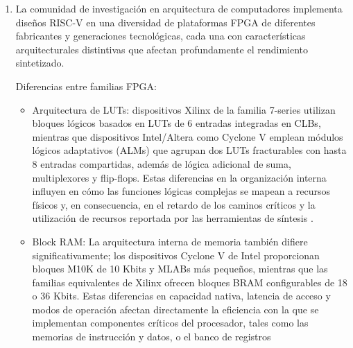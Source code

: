 \begin{enumerate}
\begin{itemize}
            \item Validación de equivalencia: después de pasar suites como riscv-tests de manera individual, es necesario comprobar que las dos microarquitecturas den resultados exactamente coincidentes (bit a bit) para programas más complejos, no solo que ambas sean funcionalmente correctas en forma aislada. Esto implica ejecutar las mismas cargas de trabajo sobre ambos diseños, capturar los estados finales relevantes (registros, memoria) y compararlos de forma sistemática. En la práctica, diferentes reportes de la industria y de la comunidad RISC-V coinciden en que la verificación funcional y la depuración de procesadores consumen una fracción muy significativa del esfuerzo total de desarrollo debido a la necesidad de combinar pruebas dirigidas, suites de conformidad, generación de tests aleatorios y, cada vez más, herramientas de verificación formal como riscv-formal.  Dado que gran parte de este esfuerzo debe repetirse para cada variante de microarquitectura, implementar y verificar simultáneamente una versión monociclo y una versión pipeline tiende a incrementar sustancialmente la carga total de verificación.
           \end{itemize}

           \item La comunidad de investigación en arquitectura de computadores implementa diseños RISC-V en una diversidad de plataformas FPGA de diferentes fabricantes y generaciones tecnológicas, cada una con características arquitecturales distintivas que afectan profundamente el rendimiento sintetizado.

            Diferencias entre familias FPGA:

            \begin{itemize}
                \item Arquitectura de LUTs: dispositivos Xilinx de la familia 7-series utilizan bloques lógicos basados en LUTs de 6 entradas integradas en CLBs, mientras que dispositivos Intel/Altera como Cyclone V emplean módulos lógicos adaptativos (ALMs) que agrupan dos LUTs fracturables con hasta 8 entradas compartidas, además de lógica adicional de suma, multiplexores y flip-flops. Estas diferencias en la organización interna influyen en cómo las funciones lógicas complejas se mapean a recursos físicos y, en consecuencia, en el retardo de los caminos críticos y la utilización de recursos reportada por las herramientas de síntesis \parencite{percey2007virtex5}.

            \item Block RAM: La arquitectura interna de memoria también difiere significativamente; los dispositivos Cyclone V de Intel proporcionan bloques M10K de 10 Kbits y MLABs más pequeños, mientras que las familias equivalentes de Xilinx ofrecen bloques BRAM configurables de 18 o 36 Kbits. Estas diferencias en capacidad nativa, latencia de acceso y modos de operación afectan directamente la eficiencia con la que se implementan componentes críticos del procesador, tales como las memorias de instrucción y datos, o el banco de registros \parencite{intel2016cyclone,xilinx2020ug473}


\end{itemize}
\end{enumerate}

